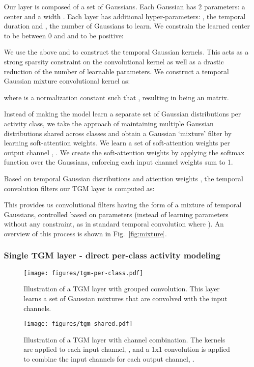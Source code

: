 \documentclass{article}
\begin{document}
Our layer is composed of a set of  Gaussians. Each Gaussian has 2 parameters: a center  and a width . Each layer has additional hyper-parameters: , the temporal duration and , the number of Gaussians to learn.  We constrain the learned center to be between 0 and  and  to be positive:

We use the above  and  to construct the temporal Gaussian kernels. This acts as a strong sparsity constraint on the convolutional kernel as well as a drastic reduction of the number of learnable parameters. We construct a temporal Gaussian mixture convolutional kernel as:

where  is a normalization constant such that , resulting in  being an  matrix.

Instead of making the model learn a separate set of Gaussian distributions per activity class, we take the approach of maintaining multiple Gaussian distributions shared across classes and obtain a Gaussian `mixture' filter by learning soft-attention weights. We learn a set of soft-attention weights per output channel , . We create the soft-attention weights by applying the softmax function over the  Gaussians, enforcing each input channel weights sum to 1.



Based on temporal Gaussian distributions  and attention weights , the temporal convolution filters our TGM layer is computed as:

This provides us convolutional filters having the form of a mixture of temporal Gaussians, controlled based on  parameters (instead of learning  parameters without any constraint, as in standard temporal convolution where ). An overview of this process is shown in Fig.~\ref{fig:mixture}.


\subsubsection{Single TGM layer - direct per-class activity modeling}
\begin{figure}
    \centering
    \texttt{[image: figures/tgm-per-class.pdf]}
    \caption{Illustration of a TGM layer with grouped convolution. This layer learns a set of  Gaussian mixtures that are convolved with the input channels.}
    \label{fig:per-class}
\end{figure}

\begin{figure*}
    \centering
    \texttt{[image: figures/tgm-shared.pdf]}
    \caption{Illustration of a TGM layer with channel combination. The kernels are applied to each input channel, , and a 1x1 convolution is applied to combine the  input channels for each output channel, .}
    \label{fig:shared}
\end{figure*}
\end{document}
